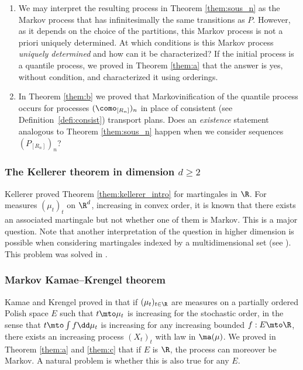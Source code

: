 
\label{ss:marko}
\begin{enumerate}
\item
We may interpret the resulting process in Theorem \ref{them:sous_n} as the Markov process that has infinitesimally the same transitions as $P$. However, as it depends on the choice of the partitions, this Markov process is not a priori uniquely determined. At which conditions is this Markov process \emph{uniquely determined} and how can it be characterized? If the initial process is a quantile process, we proved in Theorem \ref{them:a} that the answer is yes, without condition, and characterized it using orderings.

\item
In Theorem \ref{them:b} we proved that Markovinification of the quantile process occurs for processes $(\como_{[R_n]})_n$ in place of consistent (see Definition\ \ref{defi:consist}) transport plans. Does an \emph{existence} statement analogous to Theorem \ref{them:sous_n} happen when we consider sequences $(P_{[R_n]})_{n}$?\enlargethispage{.5\baselineskip}%
\end{enumerate}

\subsubsection{The Kellerer theorem in dimension $d\geq 2$}\label{ss:Kel_dimsup}
Kellerer proved Theorem \ref{them:kellerer_intro} for martingales in $\R$. For measures $(\mu_t)_t$ on $\R^d$, increasing in convex order, it is known that there exists an associated martingale \cite{HiRo13,BHS} but not whether one of them is Markov. This is a major question. Note that another interpretation of the question in higher dimension is possible when considering martingales indexed by a multidimensional set (see \cite[Prob.\,7b]{HPRY}). This problem was solved in \cite{Ju_seminaire}.

\subsubsection{Markov Kamae--Krengel theorem}\label{ss:marko_kk}
Kamae and Krengel proved in \cite{KaKr} that if $(\mu_t)_{t\in \R}$ are measures on a partially ordered Polish space $E$ such that $t\mto\mu_t$ is increasing for the stochastic order, in the sense that $t\mto \int f\dd\mu_t$ is increasing for any increasing bounded $f:E\mto \R$, there exists an increasing process $(X_t)_t$ with law in $\ma(\mu)$. We proved in Theorem \ref{them:a} and \ref{them:c} that if $E$ is $\R$, the process can moreover be Markov. A natural problem is whether this is also true for any $E$.

